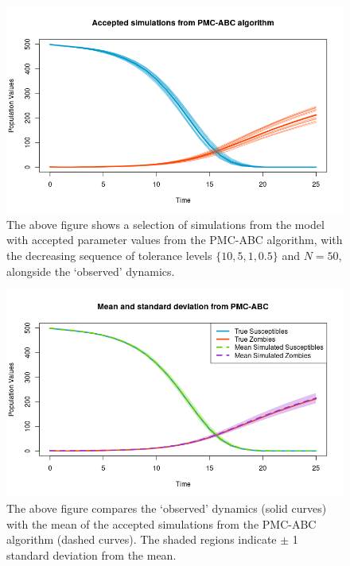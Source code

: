 \documentclass[]{article}
\begin{document}
\begin{figure}[H]
	\centering
	\includegraphics[width=0.8\linewidth]{../Figures/PMC-ABC_simulations}
	\caption{The above figure shows a selection of simulations from the model with accepted parameter values from the PMC-ABC algorithm, with the decreasing sequence of tolerance levels $\{ 10, 5, 1, 0.5\}$ and $N=50$, alongside the `observed' dynamics.}
	\label{pmc_abc_acc_simulations}
\end{figure}

\begin{figure}[H]
	\centering
	\includegraphics[width=0.8\linewidth]{../Figures/PMC_ABC_sd_bands}
	\caption{The above figure compares the `observed' dynamics (solid curves) with the mean of the accepted simulations from the PMC-ABC algorithm (dashed curves). The shaded regions indicate $\pm$ 1 standard deviation from the mean.}
	\label{pmc_abc_sd}
\end{figure}
\end{document}
